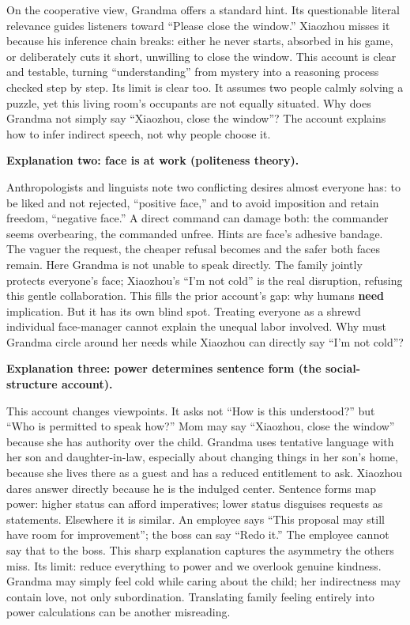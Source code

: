 On the cooperative view, Grandma offers a standard hint. Its questionable literal relevance guides listeners toward ``Please close the window.'' Xiaozhou misses it because his inference chain breaks: either he never starts, absorbed in his game, or deliberately cuts it short, unwilling to close the window. This account is clear and testable, turning ``understanding'' from mystery into a reasoning process checked step by step. Its limit is clear too. It assumes two people calmly solving a puzzle, yet this living room's occupants are not equally situated. Why does Grandma not simply say ``Xiaozhou, close the window''? The account explains how to infer indirect speech, not why people choose it.

\textbf{Explanation two: face is at work (politeness theory).}

Anthropologists and linguists note two conflicting desires almost everyone has: to be liked and not rejected, ``positive face,'' and to avoid imposition and retain freedom, ``negative face.'' A direct command can damage both: the commander seems overbearing, the commanded unfree. Hints are face's adhesive bandage. The vaguer the request, the cheaper refusal becomes and the safer both faces remain. Here Grandma is not unable to speak directly. The family jointly protects everyone's face; Xiaozhou's ``I'm not cold'' is the real disruption, refusing this gentle collaboration. This fills the prior account's gap: why humans \textbf{need} implication. But it has its own blind spot. Treating everyone as a shrewd individual face-manager cannot explain the unequal labor involved. Why must Grandma circle around her needs while Xiaozhou can directly say ``I'm not cold''?

\textbf{Explanation three: power determines sentence form (the social-structure account).}

This account changes viewpoints. It asks not ``How is this understood?'' but ``Who is permitted to speak how?'' Mom may say ``Xiaozhou, close the window'' because she has authority over the child. Grandma uses tentative language with her son and daughter-in-law, especially about changing things in her son's home, because she lives there as a guest and has a reduced entitlement to ask. Xiaozhou dares answer directly because he is the indulged center. Sentence forms map power: higher status can afford imperatives; lower status disguises requests as statements. Elsewhere it is similar. An employee says ``This proposal may still have room for improvement''; the boss can say ``Redo it.'' The employee cannot say that to the boss. This sharp explanation captures the asymmetry the others miss. Its limit: reduce everything to power and we overlook genuine kindness. Grandma may simply feel cold while caring about the child; her indirectness may contain love, not only subordination. Translating family feeling entirely into power calculations can be another misreading.

